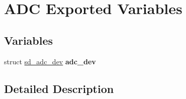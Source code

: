 \hypertarget{group___s_d___a_d_c___exported___variables}{}\section{A\+DC Exported Variables}
\label{group___s_d___a_d_c___exported___variables}
\subsection*{Variables}
\begin{DoxyCompactItemize}
\item 
\mbox{\label{group___s_d___a_d_c___exported___variables_gacdd3b348c4e48a6d03704163a349138a}} 
struct \mbox{\hyperlink{structsd__adc__dev}{sd\+\_\+adc\+\_\+dev}} {\bfseries adc\+\_\+dev}
\end{DoxyCompactItemize}


\subsection{Detailed Description}
